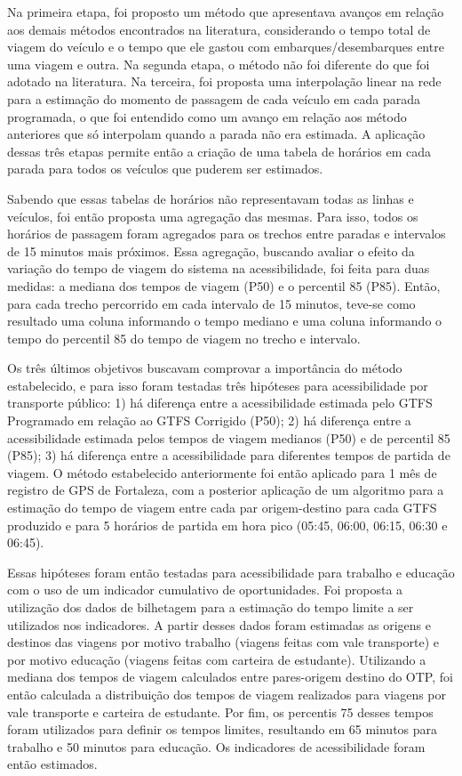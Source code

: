 \documentclass[        
    a4paper,          %
    12pt,             %
    chapter=TITLE,    %
    section=Title,    %
    subsection=Title, %
    oneside,          %
    english,          %
    spanish,          %
    brazil,           %
    fleqn             %
]{abntex2}
\begin{document}
  Na primeira etapa, foi proposto um método que apresentava avanços em relação aos demais métodos encontrados na literatura, considerando o tempo total de viagem do veículo e o tempo que ele gastou com embarques/desembarques entre uma viagem e outra. Na segunda etapa, o método não foi diferente do que foi adotado na literatura. Na terceira, foi proposta uma interpolação linear na rede para a estimação do momento de passagem de cada veículo em cada parada programada, o que foi entendido como um avanço em relação aos método anteriores que só interpolam quando a parada não era estimada. A aplicação dessas três etapas permite então a criação de uma tabela de horários em cada parada para todos os veículos que puderem ser estimados.
  
  Sabendo que essas tabelas de horários não representavam todas as linhas e veículos, foi então proposta uma agregação das mesmas. Para isso, todos os horários de passagem foram agregados para os trechos entre paradas e intervalos de 15 minutos mais próximos. Essa agregação, buscando avaliar o efeito da variação do tempo de viagem do sistema na acessibilidade, foi feita para duas medidas: a mediana dos tempos de viagem (P50) e o percentil 85 (P85). Então, para cada trecho percorrido em cada intervalo de 15 minutos, teve-se como resultado uma coluna informando o tempo mediano e uma coluna informando o tempo do percentil 85 do tempo de viagem no trecho e intervalo.
  
  Os três últimos objetivos buscavam comprovar a importância do método estabelecido, e para isso foram testadas três hipóteses para acessibilidade por transporte público: 1) há diferença entre a acessibilidade estimada pelo GTFS Programado em relação ao GTFS Corrigido (P50); 2) há diferença entre a acessibilidade estimada pelos tempos de viagem medianos (P50) e de percentil 85 (P85); 3) há diferença entre a acessibilidade para diferentes tempos de partida de viagem. O método estabelecido anteriormente foi então aplicado para 1 mês de registro de GPS de Fortaleza, com a posterior aplicação de um algoritmo para a estimação do tempo de viagem entre cada par origem-destino para cada GTFS produzido e para 5 horários de partida em hora pico (05:45, 06:00, 06:15, 06:30 e 06:45).
  
  Essas hipóteses foram então testadas para acessibilidade para trabalho e educação com o uso de um indicador cumulativo de oportunidades. Foi proposta a utilização dos dados de bilhetagem para a estimação do tempo limite a ser utilizados nos indicadores. A partir desses dados foram estimadas as origens e destinos das viagens por motivo trabalho (viagens feitas com vale transporte) e por motivo educação (viagens feitas com carteira de estudante). Utilizando a mediana dos tempos de viagem calculados entre pares-origem destino do OTP, foi então calculada a distribuição dos tempos de viagem realizados para viagens por vale transporte e carteira de estudante. Por fim, os percentis 75 desses tempos foram utilizados para definir os tempos limites, resultando em 65 minutos para trabalho e 50 minutos para educação. Os indicadores de acessibilidade foram então estimados.
  
\end{document}
